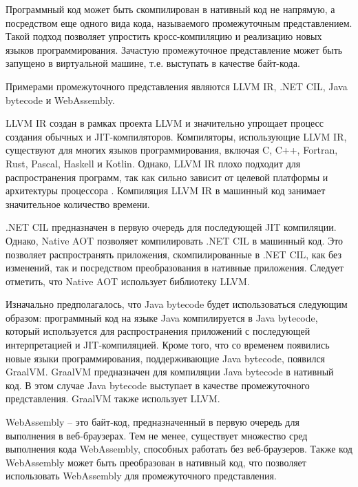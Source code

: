 Программный код может быть скомпилирован в нативный код не напрямую, а посредством еще одного вида кода, называемого промежуточным представлением.
Такой подход позволяет упростить кросс-компиляцию и реализацию новых языков программирования. 
Зачастую промежуточное представление может быть запущено в виртуальной машине, т.е. выступать в качестве байт-кода.

Примерами промежуточного представления являются LLVM IR, .NET CIL, Java bytecode и WebAssembly.

LLVM IR создан в рамках проекта LLVM и значительно упрощает процесс создания обычных и JIT-компиляторов. 
Компиляторы, использующие LLVM IR, существуют для многих языков программирования, включая C, C++, Fortran, Rust, Pascal, Haskell и Kotlin. 
Однако, LLVM IR плохо подходит для распространения программ, так как сильно зависит от целевой платформы и архитектуры процессора \cite{LLVMNotPortable}.
Компиляция LLVM IR в машинный код занимает значительное количество времени.

.NET CIL предназначен в первую очередь для последующей JIT компиляции. 
Однако, Native AOT позволяет компилировать .NET CIL в машинный код.
Это позволяет распространять приложения, скомпилированные в .NET CIL, как без изменений, так и посредством преобразования в нативные приложения.
Следует отметить, что Native AOT использует библиотеку LLVM.

Изначально предполагалось, что Java bytecode будет использоваться следующим образом: программный код на языке Java компилируется в Java bytecode, который используется для распространения приложений с последующей интерпретацией и JIT-компиляцией.
Кроме того, что со временем появились новые языки программирования, поддерживающие Java bytecode, появился GraalVM.
GraalVM предназначен для компиляции Java bytecode в нативный код.
В этом случае Java bytecode выступает в качестве промежуточного представления.
GraalVM также использует LLVM.

WebAssembly -- это байт-код, предназначенный в первую очередь для выполнения в веб-браузерах.
Тем не менее, существует множество сред выполнения кода WebAssembly, способных работать без веб-браузеров.
Также код WebAssembly может быть преобразован в нативный код, что позволяет использовать WebAssembly для промежуточного представления.
